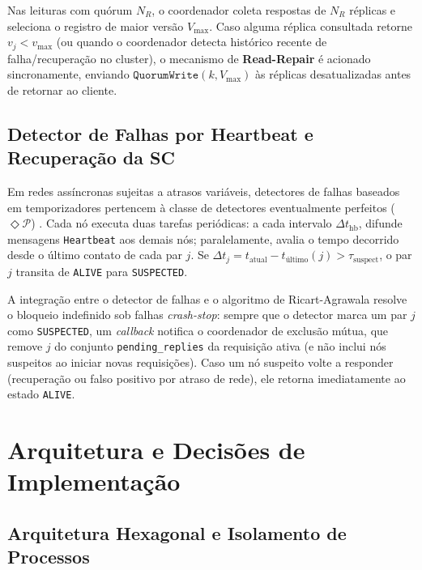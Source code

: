 \documentclass[conference,10pt]{IEEEtran}
\begin{document}
Nas leituras com quórum $N_R$, o coordenador coleta respostas de $N_R$ réplicas e seleciona o registro de maior versão $V_{\max}$. Caso alguma réplica consultada retorne $v_j < v_{\max}$ (ou quando o coordenador detecta histórico recente de falha/recuperação no cluster), o mecanismo de \textbf{Read-Repair} é acionado sincronamente, enviando $\texttt{QuorumWrite}(k, V_{\max})$ às réplicas desatualizadas antes de retornar ao cliente.

\subsection{Detector de Falhas por Heartbeat e Recuperação da SC}

Em redes assíncronas sujeitas a atrasos variáveis, detectores de falhas baseados em temporizadores pertencem à classe de detectores eventualmente perfeitos ($\Diamond \mathcal{P}$) \cite{chandra1996}. Cada nó executa duas tarefas periódicas: a cada intervalo $\Delta t_{\text{hb}}$, difunde mensagens \texttt{Heartbeat} aos demais nós; paralelamente, avalia o tempo decorrido desde o último contato de cada par $j$. Se $\Delta t_j = t_{\text{atual}} - t_{\text{último}}(j) > \tau_{\text{suspect}}$, o par $j$ transita de \texttt{ALIVE} para \texttt{SUSPECTED}.

A integração entre o detector de falhas e o algoritmo de Ricart-Agrawala resolve o bloqueio indefinido sob falhas \textit{crash-stop}: sempre que o detector marca um par $j$ como \texttt{SUSPECTED}, um \textit{callback} notifica o coordenador de exclusão mútua, que remove $j$ do conjunto \texttt{pending\_replies} da requisição ativa (e não inclui nós suspeitos ao iniciar novas requisições). Caso um nó suspeito volte a responder (recuperação ou falso positivo por atraso de rede), ele retorna imediatamente ao estado \texttt{ALIVE}.

\section{Arquitetura e Decisões de Implementação}

\subsection{Arquitetura Hexagonal e Isolamento de Processos}
\end{document}
